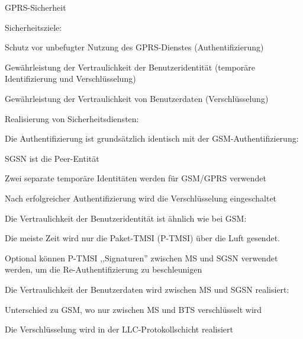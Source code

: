 \documentclass[a4paper]{article}
\begin{document}
\begin{multicols}{3}
      GPRS-Sicherheit
      \begin{itemize*}
            \item Sicherheitsziele:
            \begin{itemize*}
                  \item Schutz vor unbefugter Nutzung des GPRS-Dienstes (Authentifizierung)
                  \item Gewährleistung der Vertraulichkeit der Benutzeridentität (temporäre Identifizierung und Verschlüsselung)
                  \item Gewährleistung der Vertraulichkeit von Benutzerdaten (Verschlüsselung)
            \end{itemize*}
            \item Realisierung von Sicherheitsdiensten:
            \begin{itemize*}
                  \item Die Authentifizierung ist grundsätzlich identisch mit der GSM-Authentifizierung:
                  \begin{itemize*}
                        \item SGSN ist die Peer-Entität
                        \item Zwei separate temporäre Identitäten werden für GSM/GPRS verwendet
                        \item Nach erfolgreicher Authentifizierung wird die Verschlüsselung eingeschaltet
                  \end{itemize*}
                  \item Die Vertraulichkeit der Benutzeridentität ist ähnlich wie bei GSM:
                  \begin{itemize*}
                        \item Die meiste Zeit wird nur die Paket-TMSI (P-TMSI) über die Luft gesendet.
                        \item Optional können P-TMSI ,,Signaturen'' zwischen MS und SGSN verwendet werden, um die Re-Authentifizierung zu beschleunigen
                  \end{itemize*}
                  \item Die Vertraulichkeit der Benutzerdaten wird zwischen MS und SGSN realisiert:
                  \begin{itemize*}
                        \item Unterschied zu GSM, wo nur zwischen MS und BTS verschlüsselt wird
                        \item Die Verschlüsselung wird in der LLC-Protokollschicht realisiert
                  \end{itemize*}
            \end{itemize*}
      \end{itemize*}


\end{multicols}
\end{document}
